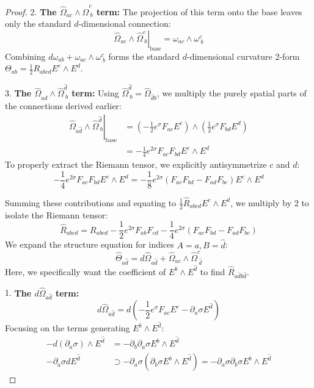 \begin{tcolorbox}[breakable]
\begin{proof}
			2. \textbf{The $\hat{\Omega}_{ac} \wedge \hat{\Omega}^c_{\ b}$ term:}
			The projection of this term onto the base leaves only the standard $d$-dimensional connection:
			\begin{equation}
				\left. \hat{\Omega}_{ac} \wedge \hat{\Omega}^c_{\ b} \right|_{\text{base}} = \omega_{ac} \wedge \omega^c_{\ b}
			\end{equation}
			Combining $d\omega_{ab} + \omega_{ac} \wedge \omega^c_{\ b}$ forms the standard $d$-dimensional curvature 2-form $\Theta_{ab} = \frac{1}{2} R_{abcd} E^c \wedge E^d$.
			
			3. \textbf{The $\hat{\Omega}_{a\hat{d}} \wedge \hat{\Omega}^{\hat{d}}_{\ b}$ term:}
			Using $\hat{\Omega}^{\hat{d}}_{\ b} = \hat{\Omega}_{\hat{d}b}$, we multiply the purely spatial parts of the connections derived earlier:
			\begin{align}
				\left. \hat{\Omega}_{a\hat{d}} \wedge \hat{\Omega}^{\hat{d}}_{\ b} \right|_{\text{base}} &= \left( -\frac{1}{2} e^\sigma F_{ac} E^c \right) \wedge \left( \frac{1}{2} e^\sigma F_{bd} E^d \right) \nonumber \\
				&= -\frac{1}{4} e^{2\sigma} F_{ac} F_{bd} E^c \wedge E^d
			\end{align}
			To properly extract the Riemann tensor, we explicitly antisymmetrize $c$ and $d$:
			\begin{equation}
				-\frac{1}{4} e^{2\sigma} F_{ac} F_{bd} E^c \wedge E^d = -\frac{1}{8} e^{2\sigma} (F_{ac} F_{bd} - F_{ad} F_{bc}) E^c \wedge E^d
			\end{equation}
			
			Summing these contributions and equating to $\frac{1}{2}\hat{R}_{abcd} E^c \wedge E^d$, we multiply by 2 to isolate the Riemann tensor:
			\begin{equation} \label{eq:Rabcd}
				\hat{R}_{abcd} = R_{abcd} - \frac{1}{2} e^{2\sigma} F_{ab} F_{cd} - \frac{1}{4} e^{2\sigma} (F_{ac} F_{bd} - F_{ad} F_{bc})
			\end{equation}
			We expand the structure equation for indices $A=a, B=\hat{d}$:
			\begin{equation}
				\hat{\Theta}_{a\hat{d}} = d\hat{\Omega}_{a\hat{d}} + \hat{\Omega}_{ac} \wedge \hat{\Omega}^c_{\ \hat{d}}
			\end{equation}
			Here, we specifically want the coefficient of $E^b \wedge E^{\hat{d}}$ to find $\hat{R}_{a\hat{d}b\hat{d}}$.
			
			1. \textbf{The $d\hat{\Omega}_{a\hat{d}}$ term:}
			\begin{equation}
				d\hat{\Omega}_{a\hat{d}} = d\left( -\frac{1}{2} e^\sigma F_{ac} E^c - \partial_a \sigma E^{\hat{d}} \right)
			\end{equation}
			Focusing on the terms generating $E^b \wedge E^{\hat{d}}$:
			\begin{align}
				-d(\partial_a \sigma) \wedge E^{\hat{d}} &= -\partial_b \partial_a \sigma E^b \wedge E^{\hat{d}} \\
				-\partial_a \sigma dE^{\hat{d}} &\supset -\partial_a \sigma (\partial_b \sigma E^b \wedge E^{\hat{d}}) = -\partial_a \sigma \partial_b \sigma E^b \wedge E^{\hat{d}}
			\end{align}
			

\end{proof}
\end{tcolorbox}
